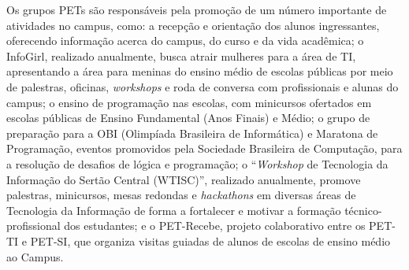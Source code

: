 Os grupos PETs são responsáveis pela promoção de um número importante de atividades no campus, como: a recepção e orientação dos alunos ingressantes, oferecendo informação acerca do campus, do curso e da vida acadêmica; o InfoGirl, realizado anualmente, busca atrair mulheres para a área de TI, apresentando a área para meninas do ensino médio de escolas públicas por meio de palestras, oficinas, \textit{workshops} e roda de conversa com profissionais e alunas do campus; o ensino de programação nas escolas, com minicursos ofertados em escolas públicas de Ensino Fundamental (Anos Finais) e Médio; o grupo de preparação para a OBI (Olimpíada Brasileira de Informática) e Maratona de Programação, eventos promovidos pela Sociedade Brasileira de Computação, para a resolução de desafios de lógica e programação; o ``\textit{Workshop} de Tecnologia da Informação do Sertão Central (WTISC)'', realizado anualmente, promove palestras, minicursos, mesas redondas e \textit{hackathons} em diversas  áreas de Tecnologia da Informação de forma a fortalecer e motivar a formação técnico-profissional dos estudantes; e o PET-Recebe, projeto colaborativo entre os PET-TI e PET-SI, que organiza visitas guiadas de alunos de escolas de ensino médio ao Campus.




